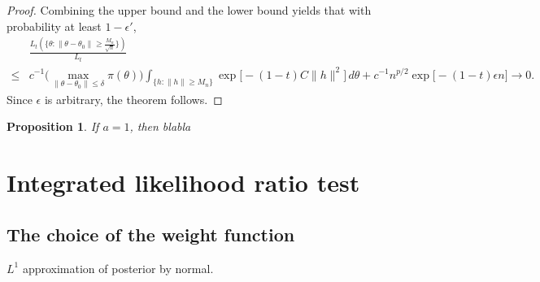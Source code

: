 \documentclass[3p]{elsarticle}
\theoremstyle{plain}
\newtheorem{proposition}{\quad\quad Proposition}
\theoremstyle{definition}
\theoremstyle{remark}
\begin{document}
\begin{proof}
     Combining the upper bound and the lower bound yields that with probability at least $1-\epsilon'$,
     $$
     \begin{aligned}
         &
       \frac{L_{t} ( \{\theta: \|\theta-\theta_0\|\geq \frac{M_n}{\sqrt{n}}\})}{L_{t}}
          \\
          \leq&
         c^{-1}\big(\max_{\|\theta-\theta_0\|\leq \delta} \pi(\theta)\big)
         \int_{\big\{h:\|h\|\geq M_n\big\}}\exp\big[-(1-t)C \|h\|^2\big]\, d\theta
        +
         c^{-1}n^{p/2} \exp\big[-(1-t)\epsilon n\big]
         \to 0.
     \end{aligned}
     $$
    Since $\epsilon $ is arbitrary, the theorem follows.
\end{proof}








\begin{proposition}
    If $a=1$, then blabla
\end{proposition}




\section{Integrated likelihood ratio test}

\subsection{The choice of the weight function}
$L^1$ approximation of posterior by normal.
\end{document}
